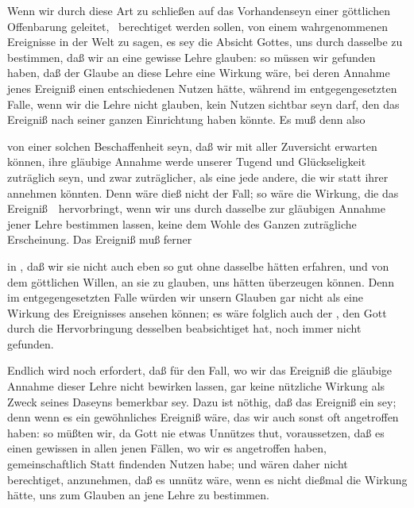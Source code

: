 Wenn wir durch diese Art zu schließen auf das Vorhandenseyn einer göttlichen Offenbarung geleitet, \dh\ berechtiget werden sollen, von einem wahrgenommenen Ereignisse in der Welt zu sagen, es sey die Absicht Gottes, uns durch dasselbe zu bestimmen, daß wir an eine gewisse Lehre glauben: so müssen wir gefunden haben, daß der Glaube an diese Lehre eine Wirkung wäre, bei deren Annahme jenes Ereigniß einen entschiedenen Nutzen hätte, während im entgegengesetzten Falle, wenn wir die Lehre nicht glauben, kein Nutzen sichtbar seyn darf, den das Ereigniß nach seiner ganzen Einrichtung haben könnte. Es muß denn also
\begin{aufza}
\item {} von einer solchen Beschaffenheit seyn, daß wir mit aller Zuversicht erwarten können, ihre gläubige Annahme werde unserer Tugend und Glückseligkeit zuträglich seyn, und zwar zuträglicher, als eine jede andere, die wir statt ihrer annehmen könnten. Denn wäre dieß nicht der Fall; so wäre die Wirkung, die das Ereigniß~\ hervorbringt, wenn wir uns durch dasselbe zur gläubigen Annahme jener Lehre bestimmen lassen, keine dem Wohle des Ganzen zuträgliche Erscheinung. Das Ereigniß muß ferner
\item in , daß wir sie nicht auch eben so gut ohne dasselbe hätten erfahren, und von dem göttlichen Willen, an sie zu glauben, uns hätten überzeugen können. Denn im entgegengesetzten Falle würden wir unsern Glauben gar nicht als eine Wirkung des Ereignisses ansehen können; es wäre folglich auch der , den Gott durch die Hervorbringung desselben beabsichtiget hat, noch immer nicht gefunden.
\item Endlich wird noch erfordert, daß für den Fall, wo wir das Ereigniß die gläubige Annahme dieser Lehre nicht bewirken lassen, gar keine nützliche Wirkung als Zweck seines Daseyns bemerkbar sey. Dazu ist nöthig, daß das Ereigniß ein  sey; denn wenn es ein gewöhnliches Ereigniß wäre, das wir auch sonst oft angetroffen haben: so müßten wir, da Gott nie etwas Unnützes thut, voraussetzen, daß es einen gewissen in allen jenen Fällen, wo wir es angetroffen haben, gemeinschaftlich Statt findenden Nutzen habe; und wären daher nicht berechtiget, anzunehmen, daß es unnütz wäre, wenn es nicht dießmal die Wirkung hätte, uns zum Glauben an jene Lehre zu bestimmen.
\end{aufza}

